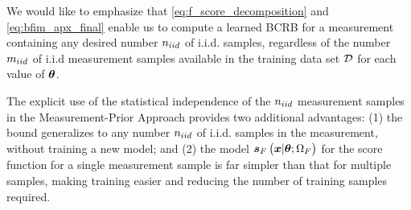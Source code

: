 We would like to emphasize that \eqref{eq:f_score_decomposition} and \eqref{eq:bfim_apx_final} enable us to compute a {learned} BCRB for a measurement containing any desired number $n_{iid}$ of i.i.d. samples, {regardless of the number $m_{iid}$ of i.i.d measurement samples available in the training data set $\mathcal{D}$ for each value of $\bm{\theta}$.} 

{The explicit use of the statistical independence of the $n_{iid}$ measurement samples in the Measurement-Prior Approach provides two additional advantages:} (1) 
the bound generalizes to any number $n_{iid}$ of i.i.d. samples {in the measurement,} without  training a new model; and (2) {
the model $\bm{s}_{F}\left(\bm{x}|\bm{\theta};\Omega_{F}\right)$ for the score function for a single measurement sample is far simpler than that for multiple samples, making training easier and reducing the number of training samples required.}
 

